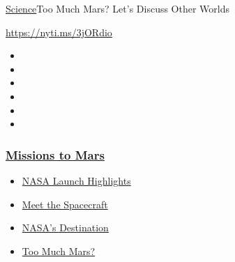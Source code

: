 \href{/section/science}{Science}\textbar{}Too Much Mars? Let's Discuss
Other Worlds

\url{https://nyti.ms/3jORdio}

\begin{itemize}
\item
\item
\item
\item
\item
\item
\end{itemize}

\hypertarget{missions-to-mars}{%
\subsubsection{\texorpdfstring{\href{https://www.nytimes3xbfgragh.onion/news-event/summer-of-mars?name=styln-mars\&region=TOP_BANNER\&variant=undefined\&block=storyline_menu_recirc\&action=click\&pgtype=Article\&impression_id=8a65ad20-e38b-11ea-af50-edb5cee8ee78}{Missions
to Mars}}{Missions to Mars}}\label{missions-to-mars}}

\begin{itemize}
\tightlist
\item
  \href{https://www.nytimes3xbfgragh.onion/2020/07/30/science/nasa-mars-launch.html?name=styln-mars\&region=TOP_BANNER\&variant=undefined\&block=storyline_menu_recirc\&action=click\&pgtype=Article\&impression_id=8a65ad21-e38b-11ea-af50-edb5cee8ee78}{NASA
  Launch Highlights}
\item
  \href{https://www.nytimes3xbfgragh.onion/interactive/2020/science/mars-perseverance-tianwen-hope.html?name=styln-mars\&region=TOP_BANNER\&variant=undefined\&block=storyline_menu_recirc\&action=click\&pgtype=Article\&impression_id=8a65d430-e38b-11ea-af50-edb5cee8ee78}{Meet
  the Spacecraft}
\item
  \href{https://www.nytimes3xbfgragh.onion/2020/07/28/science/nasa-jezero-perseverance.html?name=styln-mars\&region=TOP_BANNER\&variant=undefined\&block=storyline_menu_recirc\&action=click\&pgtype=Article\&impression_id=8a65d431-e38b-11ea-af50-edb5cee8ee78}{NASA's
  Destination}
\item
  \href{https://www.nytimes3xbfgragh.onion/2020/07/28/science/mars-nasa-science.html?name=styln-mars\&region=TOP_BANNER\&variant=undefined\&block=storyline_menu_recirc\&action=click\&pgtype=Article\&impression_id=8a65d432-e38b-11ea-af50-edb5cee8ee78}{Too
  Much Mars?}
\end{itemize}

